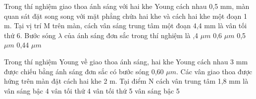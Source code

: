 \begin{ex}%
Trong thí nghiệm giao thoa ánh sáng với hai khe Young cách nhau 0,5 mm, màn quan sát đặt song song với mặt phẳng chứa hai khe và cách hai khe một đoạn 1 m. Tại vị trí M trên màn, cách vân sáng trung tâm một đoạn 4,4 mm là vân tối thứ 6. Bước sóng $\lambda $ của ánh sáng đơn sắc trong thí nghiệm là
\choice
{,4 $\mu m $}
{0,6 $\mu m $}
{0,5 $\mu m $}
{0,44 $\mu m $}
\end{ex} 
\begin{ex}%
Trong thí nghiệm Young về giao thoa ánh sáng, hai khe Young cách nhau 3 mm được chiếu bằng ánh sáng đơn sắc có bước sóng 0,60 $\mu m $. Các vân giao thoa được hứng trên màn đặt cách hai khe 2 m. Tại điểm N cách vân trung tâm 1,8 mm là
\choice
{vân sáng bậc 4}
{vân tối thứ 4}
{\True vân tối thứ 5}
{vân sáng bậc 5}
\end{ex} 

